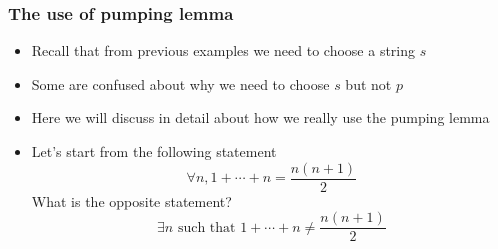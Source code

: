 




\begin{frame}[allowframebreaks] \frametitle{The use of pumping lemma}
  \begin{itemize}
  \item Recall that from previous examples we need to choose a string $s$
  \item Some are confused about why we need to choose $s$ but not $p$
  \item Here we will discuss in detail about how we really use the pumping lemma
  \item Let's start from the following statement
    \begin{equation*}
      \forall n, 1 + \cdots + n = \frac{n(n+1)}{2}
    \end{equation*}
    What is the opposite statement?
    \begin{equation*}
      \exists n \text{ such that } 1 + \cdots + n \neq  \frac{n(n+1)}{2}
    \end{equation*}
    

\end{itemize}
\end{frame}
